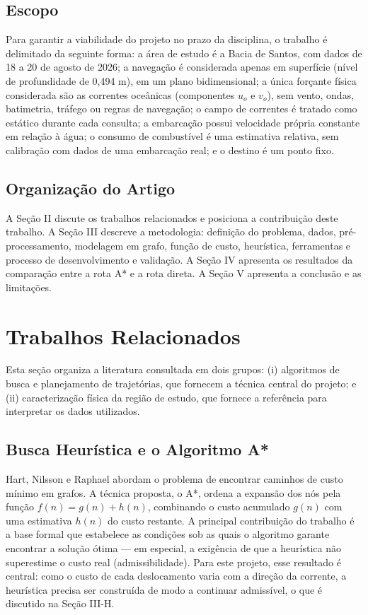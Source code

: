 \documentclass[conference]{IEEEtran}
\begin{document}
\subsection{Escopo}
Para garantir a viabilidade do projeto no prazo da disciplina, o trabalho é delimitado da seguinte forma: a área de estudo é a Bacia de Santos, com dados de 18 a 20 de agosto de 2026; a navegação é considerada apenas em superfície (nível de profundidade de 0,494 m), em um plano bidimensional; a única forçante física considerada são as correntes oceânicas (componentes $u_o$ e $v_o$), sem vento, ondas, batimetria, tráfego ou regras de navegação; o campo de correntes é tratado como estático durante cada consulta; a embarcação possui velocidade própria constante em relação à água; o consumo de combustível é uma estimativa relativa, sem calibração com dados de uma embarcação real; e o destino é um ponto fixo.

\subsection{Organização do Artigo}
A Seção II discute os trabalhos relacionados e posiciona a contribuição deste trabalho. A Seção III descreve a metodologia: definição do problema, dados, pré-processamento, modelagem em grafo, função de custo, heurística, ferramentas e processo de desenvolvimento e validação. A Seção IV apresenta os resultados da comparação entre a rota A* e a rota direta. A Seção V apresenta a conclusão e as limitações.

\section{Trabalhos Relacionados}
Esta seção organiza a literatura consultada em dois grupos: (i) algoritmos de busca e planejamento de trajetórias, que fornecem a técnica central do projeto; e (ii) caracterização física da região de estudo, que fornece a referência para interpretar os dados utilizados.

\subsection{Busca Heurística e o Algoritmo A*}
Hart, Nilsson e Raphael \cite{hart} abordam o problema de encontrar caminhos de custo mínimo em grafos. A técnica proposta, o A*, ordena a expansão dos nós pela função $f(n) = g(n) + h(n)$, combinando o custo acumulado $g(n)$ com uma estimativa $h(n)$ do custo restante. A principal contribuição do trabalho é a base formal que estabelece as condições sob as quais o algoritmo garante encontrar a solução ótima --- em especial, a exigência de que a heurística não superestime o custo real (admissibilidade). Para este projeto, esse resultado é central: como o custo de cada deslocamento varia com a direção da corrente, a heurística precisa ser construída de modo a continuar admissível, o que é discutido na Seção III-H.
\end{document}
